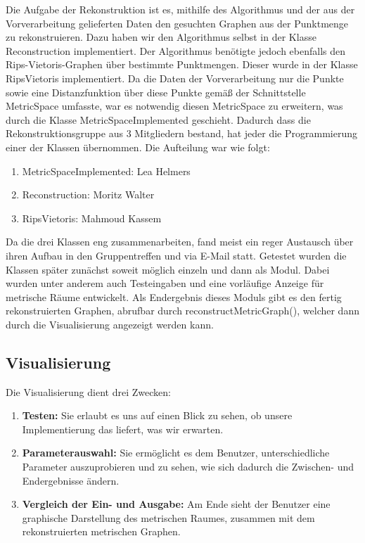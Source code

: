 \documentclass[parskip=half,
 fontsize=12pt, bibtotoc,
 titlepage, ngerman]
 {article}
\begin{document}
Die Aufgabe der Rekonstruktion ist es, mithilfe des Algorithmus und der aus der Vorverarbeitung gelieferten Daten den gesuchten Graphen aus der Punktmenge zu rekonstruieren. Dazu haben wir den Algorithmus selbst in der Klasse Reconstruction implementiert. Der Algorithmus benötigte jedoch ebenfalls den Rips-Vietoris-Graphen über bestimmte Punktmengen. Dieser wurde in der Klasse RipsVietoris implementiert. Da die Daten der Vorverarbeitung nur die Punkte sowie eine Distanzfunktion über diese Punkte gemäß der Schnittstelle MetricSpace umfasste, war es notwendig diesen MetricSpace zu erweitern, was durch die Klasse MetricSpaceImplemented geschieht. Dadurch dass die Rekonstruktionsgruppe aus 3 Mitgliedern bestand, hat jeder die Programmierung einer der Klassen übernommen. Die Aufteilung war wie folgt:

\begin{enumerate}
\item MetricSpaceImplemented: Lea Helmers
\item Reconstruction: Moritz Walter
\item RipsVietoris: Mahmoud Kassem
\end{enumerate}

Da die drei Klassen eng zusammenarbeiten, fand meist ein reger Austausch über ihren Aufbau in den Gruppentreffen und via E-Mail statt. Getestet wurden die Klassen später zunächst soweit möglich einzeln und dann als Modul. Dabei wurden unter anderem auch Testeingaben und eine vorläufige Anzeige für metrische Räume entwickelt. Als Endergebnis dieses Moduls gibt es den fertig rekonstruierten Graphen, abrufbar durch reconstructMetricGraph(), welcher dann durch die Visualisierung angezeigt werden kann.

\subsection{Visualisierung}

Die Visualisierung dient drei Zwecken:

\begin{enumerate}
\item \textbf{Testen:} Sie erlaubt es uns auf einen Blick zu sehen, ob unsere Implementierung das liefert, was wir erwarten.
\item \textbf{Parameterauswahl:} Sie ermöglicht es dem Benutzer, unterschiedliche Parameter auszuprobieren und zu sehen, wie sich dadurch die Zwischen- und Endergebnisse ändern.
\item \textbf{Vergleich der Ein- und Ausgabe:} Am Ende sieht der Benutzer eine graphische Darstellung des metrischen Raumes, zusammen mit dem rekonstruierten metrischen Graphen.
\end{enumerate}
\end{document}
